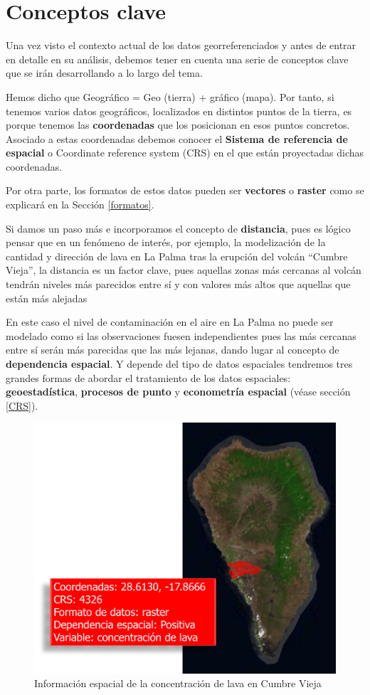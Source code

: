 \documentclass[
]{report}
\begin{document}
\hypertarget{conceptos-clave}{%
\section{Conceptos clave}\label{conceptos-clave}}

Una vez visto el contexto actual de los datos georreferenciados y antes de
entrar en detalle en su análisis, debemos tener en cuenta una serie de conceptos
clave que se irán desarrollando a lo largo del tema.

Hemos dicho que Geográfico = Geo (tierra) + gráfico (mapa). Por tanto, si
tenemos varios datos geográficos, localizados en distintos puntos de la tierra,
es porque tenemos las \textbf{coordenadas} que los posicionan en esos puntos
concretos. Asociado a estas coordenadas debemos conocer el \textbf{Sistema de
referencia de espacial} o Coordinate reference system (CRS) en el que están
proyectadas dichas coordenadas.

Por otra parte, los formatos de estos datos pueden ser \textbf{vectores} o \textbf{raster}
como se explicará en la Sección \ref{formatos}.

Si damos un paso más e incorporamos el concepto de \textbf{distancia}, pues es lógico
pensar que en un fenómeno de interés, por ejemplo, la modelización de la
cantidad y dirección de lava en La Palma tras la erupción del volcán ``Cumbre
Vieja'', la distancia es un factor clave, pues aquellas zonas más cercanas al
volcán tendrán niveles más parecidos entre sí y con valores más altos que
aquellas que están más alejadas

En este caso el nivel de contaminación en el aire en La Palma no puede ser
modelado como si las observaciones fuesen independientes pues las más cercanas
entre sí serán más parecidas que las más lejanas, dando lugar al concepto de
\textbf{dependencia espacial}. Y depende del tipo de datos espaciales tendremos tres
grandes formas de abordar el tratamiento de los datos espaciales:
\textbf{geoestadística}, \textbf{procesos de punto} y \textbf{econometría espacial} (véase
sección \ref{CRS}).

\begin{figure}

{\centering \includegraphics[width=0.6\linewidth]{img/Cumbrevieja} 

}

\caption{Información espacial de la concentración de lava en Cumbre Vieja}\label{fig:gis}
\end{figure}
\end{document}
